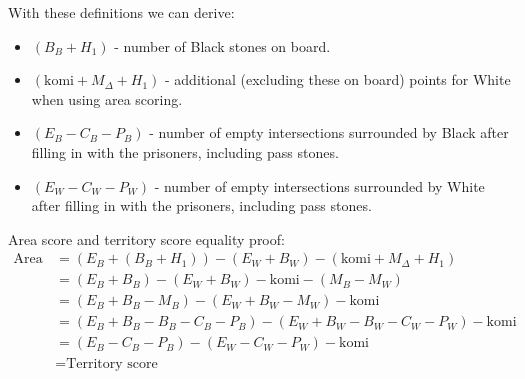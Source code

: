\documentclass[11pt]{article}
\begin{document}
With these definitions we can derive:
\begin{itemize}
    \item $(B_B+H_1)$ - number of Black stones on board.
    \item $(\text{komi} + M_\Delta + H_1)$ - additional (excluding these on board) points for White when using area scoring.
    \item $(E_B - C_B - P_B)$ - number of empty intersections surrounded by Black after filling in with the prisoners, including pass stones.
    \item $(E_W - C_W - P_W)$ - number of empty intersections surrounded by White after filling in with the prisoners, including pass stones.
\end{itemize}

Area score and territory score equality proof:
\begin{align}
\text{Area score} &= (E_B + (B_B+H_1)) - (E_W + B_W) - (\text{komi} + M_\Delta + H_1) \\
&= (E_B + B_B) - (E_W + B_W) - \text{komi} - (M_B - M_W)\\
&= (E_B + B_B - M_B) - (E_W + B_W - M_W) - \text{komi} \\
&= (E_B + B_B - B_B - C_B - P_B ) - (E_W + B_W - B_W - C_W - P_W) - \text{komi} \\
&= (E_B - C_B - P_B) - (E_W - C_W - P_W) - \text{komi} \\
&= \text{Territory score}
\end{align}
\end{document}

